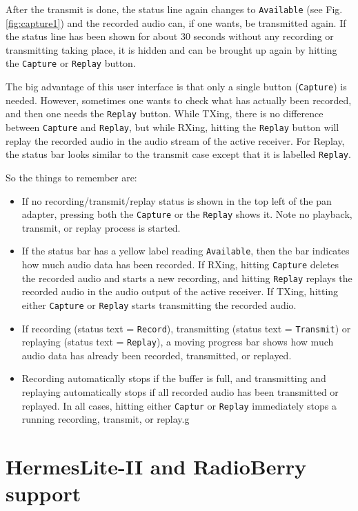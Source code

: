 \documentclass[12pt]{book}
\def\rett#1{\texttt{\color{red}#1}}
\def\bltt#1{\texttt{\color{blue}#1}}
\begin{document}
After the transmit is done, the status line again changes to \rett{Available} (see Fig. \ref{fig:capture1})
and the recorded audio can, if one wants, be transmitted again. If the status line has been shown for about
30 seconds without any recording or transmitting taking place, it is hidden and can be brought up again by
hitting the \bltt{Capture} or \bltt{Replay} button.

The big advantage of this user interface is that only a single button (\bltt{Capture}) is needed. However,
sometimes one wants to check what has actually been recorded, and then one needs the
\bltt{Replay} button. While TXing, there is no difference between \bltt{Capture} and
\bltt{Replay}, but while RXing, hitting the \bltt{Replay} button will replay the recorded audio
in the audio stream of the active receiver. For Replay, the status bar looks similar to the transmit case except
that it is labelled \rett{Replay}.


So the things to remember are:
\begin{itemize}
\item{If no recording/transmit/replay status is shown in the top left of the pan adapter, pressing
both the \bltt{Capture}
or the \bltt{Replay} shows it. Note no playback, transmit, or replay process is started.}
\item{If the status bar has a yellow label reading \rett{Available}, then the bar indicates how much
audio data has been recorded. If RXing, hitting
\bltt{Capture} deletes the recorded audio and starts a new recording, and hitting \bltt{Replay}
replays the recorded audio in the audio output of the active receiver.
If TXing, hitting either \bltt{Capture} or \bltt{Replay} starts transmitting the recorded audio.}
\item{If recording (status text = \rett{Record}), transmitting (status text = \rett{Transmit})
or replaying (status text = \rett{Replay}), a moving progress
bar shows how much audio data has already been recorded, transmitted, or replayed.}
\item{Recording automatically stops if the buffer is full, and transmitting and replaying
 automatically stops if all recorded audio
has been transmitted or replayed. In all cases, hitting either \bltt{Captur} or \bltt{Replay}
immediately stops a running recording, transmit, or replay.}g
\end{itemize}
\chapter{HermesLite-II and RadioBerry support}
\label{sec:hl2support}
\end{document}
